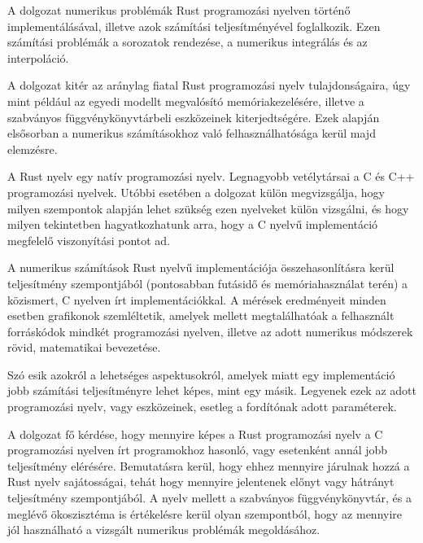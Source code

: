 
A dolgozat numerikus problémák Rust programozási nyelven történő implementálásával, illetve azok számítási teljesítményével foglalkozik. Ezen számítási problémák a sorozatok rendezése, a numerikus integrálás és az interpoláció.

A dolgozat kitér az aránylag fiatal Rust programozási nyelv tulajdonságaira, úgy mint például az egyedi modellt megvalósító memóriakezelésére, illetve a szabványos függvénykönyvtárbeli eszközeinek kiterjedtségére. Ezek alapján elsősorban a numerikus számításokhoz való felhasználhatósága kerül majd elemzésre.

A Rust nyelv egy natív programozási nyelv. Legnagyobb vetélytársai a C és C++ programozási nyelvek. Utóbbi esetében a dolgozat külön megvizsgálja, hogy milyen szempontok alapján lehet szükség ezen nyelveket külön vizsgálni, és hogy milyen tekintetben hagyatkozhatunk arra, hogy a C nyelvű implementáció megfelelő viszonyítási pontot ad.

A numerikus számítások Rust nyelvű implementációja összehasonlításra kerül teljesítmény szempontjából (pontosabban futásidő és memóriahasználat terén) a közismert, C nyelven írt implementációkkal. A mérések eredményeit minden esetben grafikonok szemléltetik, amelyek mellett megtalálhatóak a felhasznált forráskódok mindkét programozási nyelven, illetve az adott numerikus módszerek rövid, matematikai bevezetése.

Szó esik azokról a lehetséges aspektusokról, amelyek miatt egy implementáció jobb számítási teljesítményre lehet képes, mint egy másik. Legyenek ezek az adott programozási nyelv, vagy eszközeinek, esetleg a fordítónak adott paraméterek.

A dolgozat fő kérdése, hogy mennyire képes a Rust programozási nyelv a C programozási nyelven írt programokhoz hasonló, vagy esetenként annál jobb teljesítmény elérésére. Bemutatásra kerül, hogy ehhez mennyire járulnak hozzá a Rust nyelv sajátosságai, tehát hogy mennyire jelentenek előnyt vagy hátrányt teljesítmény szempontjából. A nyelv mellett a szabványos függvénykönyvtár, és a meglévő ökoszisztéma is értékelésre kerül olyan szempontból, hogy az mennyire jól használható a vizsgált numerikus problémák megoldásához.
